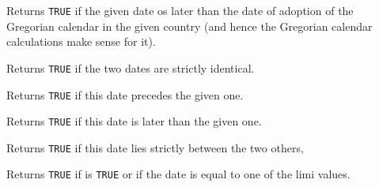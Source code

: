 Returns {\tt TRUE} if the given date os later than the date of adoption of the
Gregorian calendar in the given country (and hence the Gregorian calendar
calculations make sense for it).


\label{wxdatetimeisequalto}


Returns {\tt TRUE} if the two dates are strictly identical.

\label{wxdatetimeisearlierthan}


Returns {\tt TRUE} if this date precedes the given one.

\label{wxdatetimeislaterthan}


Returns {\tt TRUE} if this date is later than the given one.

\label{wxdatetimeisstrictlybetween}


Returns {\tt TRUE} if this date lies strictly between the two others,



\label{wxdatetimeisbetween}


Returns {\tt TRUE} if  
is {\tt TRUE} or if the date is equal to one of the limi values.



\label{wxdatetimeissamedate}



